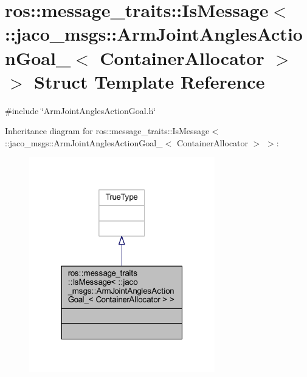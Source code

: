 \hypertarget{structros_1_1message__traits_1_1IsMessage_3_01_1_1jaco__msgs_1_1ArmJointAnglesActionGoal___3_01ContainerAllocator_01_4_01_4}{}\section{ros\+:\+:message\+\_\+traits\+:\+:Is\+Message$<$ \+:\+:jaco\+\_\+msgs\+:\+:Arm\+Joint\+Angles\+Action\+Goal\+\_\+$<$ Container\+Allocator $>$ $>$ Struct Template Reference}
\label{structros_1_1message__traits_1_1IsMessage_3_01_1_1jaco__msgs_1_1ArmJointAnglesActionGoal___3_01ContainerAllocator_01_4_01_4}


{\ttfamily \#include \char`\"{}Arm\+Joint\+Angles\+Action\+Goal.\+h\char`\"{}}



Inheritance diagram for ros\+:\+:message\+\_\+traits\+:\+:Is\+Message$<$ \+:\+:jaco\+\_\+msgs\+:\+:Arm\+Joint\+Angles\+Action\+Goal\+\_\+$<$ Container\+Allocator $>$ $>$\+:
\nopagebreak
\begin{figure}[H]
\begin{center}
\leavevmode
\includegraphics[width=229pt]{d4/dc6/structros_1_1message__traits_1_1IsMessage_3_01_1_1jaco__msgs_1_1ArmJointAnglesActionGoal___3_01C8812979152a04409f9bf0a711d3db2dd}
\end{center}
\end{figure}


